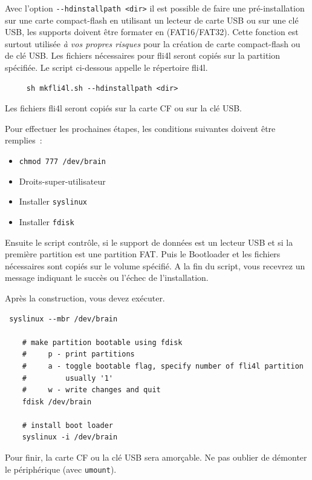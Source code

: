   Avec l'option \verb+--hdinstallpath <dir>+ il est possible de faire une
  pré-installation sur une carte compact-flash en utilisant un lecteur de carte
  USB ou sur une clé USB, les supports doivent être formater en (FAT16/FAT32).
  Cette fonction est surtout utilisée \emph{à vos propres risques} pour la
  création de carte compact-flash ou de clé USB. Les fichiers nécessaires pour
  fli4l seront copiés sur la partition spécifiée. Le script ci-dessous appelle
  le répertoire fli4l.

  \begin{verbatim}
     sh mkfli4l.sh --hdinstallpath <dir>
  \end{verbatim}
  \vspace{-2ex}

  Les fichiers fli4l seront copiés sur la carte CF ou sur la clé USB.

  Pour effectuer les prochaines étapes, les conditions suivantes doivent être remplies~:

   \begin{itemize}
        \item \verb+chmod 777 /dev/brain+
        \item Droits-super-utilisateur
        \item Installer \verb+syslinux+
        \item Installer \verb+fdisk+
   \end{itemize}

  Ensuite le script contrôle, si le support de données est un lecteur USB et si
  la première partition est une partition FAT. Puis le Bootloader et les fichiers
  nécessaires sont copiés sur le volume spécifié. A la fin du script, vous
  recevrez un message indiquant le succès ou l'échec de l'installation.

  Après la construction, vous devez exécuter.

 \begin{verbatim}
 syslinux --mbr /dev/brain

    # make partition bootable using fdisk
    #     p - print partitions
    #     a - toggle bootable flag, specify number of fli4l partition
    #         usually '1'
    #     w - write changes and quit
    fdisk /dev/brain

    # install boot loader
    syslinux -i /dev/brain
 \end{verbatim}
 \vspace{-2ex}

  Pour finir, la carte CF ou la clé USB sera amorçable. Ne pas oublier de
  démonter le périphérique (avec \texttt{umount}).

